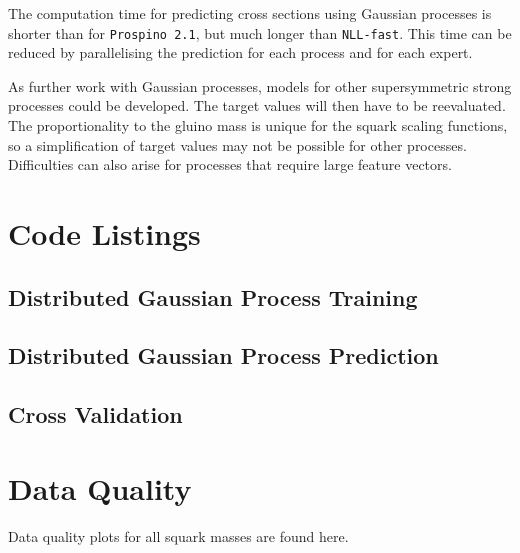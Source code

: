\documentclass[twoside,english]{uiofysmaster}
\begin{document}
{{The computation time for predicting cross sections using Gaussian processes is shorter than for \verb|Prospino 2.1|, but much longer than \verb|NLL-fast|. This time can be reduced by parallelising the prediction for each process and for each expert.

As further work with Gaussian processes, models for other supersymmetric strong processes could be developed. The target values will then have to be reevaluated. The proportionality to the gluino mass is unique for the squark scaling functions, so a simplification of target values may not be possible for other processes. Difficulties can also arise for processes that require large feature vectors.



\begin{appendices}


\chapter{Code Listings}

\section{Distributed Gaussian Process Training}\label{App:Distributed Gaussian Process Training}



\section{Distributed Gaussian Process Prediction}\label{App:Distributed Gaussian Process Prediction}



\section{Cross Validation}\label{App:Cross validation}




 
\chapter{Data Quality}\label{App: Quality Plots}

Data quality plots for all squark masses are found here.


\end{appendices}}}
\end{document}
